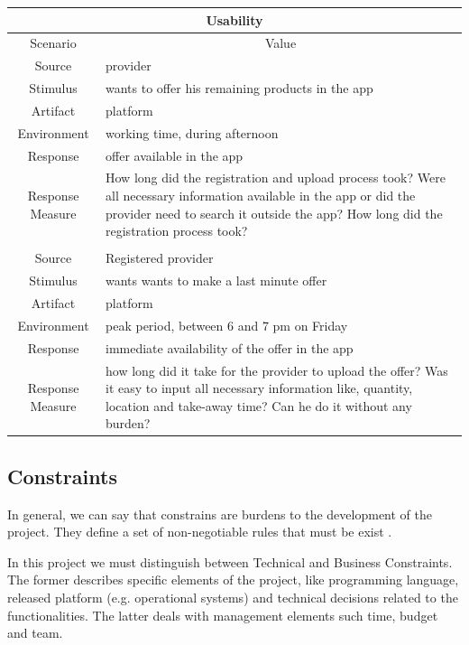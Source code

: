 \begin{table}[H]
    \begin{tabularx}{\textwidth}{|c|X|}
        \hline
        \multicolumn{2}{c}{\textbf{Usability}} \\
        \hline
        \toprule
        \multicolumn{1}{c}{Scenario} & \multicolumn{1}{c}{Value} \\
        \midrule
        Source & \gls{provider} \\
        Stimulus & wants to offer his remaining products in the app \\
        Artifact & platform \\
        Environment & working time, during afternoon \\
        Response & offer available in the app \\
        Response Measure & How long did the registration and upload process took? Were all necessary information
        available in the app or did the \gls{provider} need to search it outside the app? How long did the registration
        process took? \\
         & \\
        Source & Registered \gls{provider} \\
        Stimulus & wants wants to make a last minute offer \\
        Artifact & platform \\
        Environment & peak period, between 6 and 7 pm on Friday \\
        Response & immediate availability of the offer in the app \\
        Response Measure & how long did it take for the \gls{provider} to upload the offer? Was it easy to input all
        necessary information like, quantity, location and take-away time? Can he do it without any burden? \\
        \bottomrule
    \end{tabularx}
\end{table}

\newpage
\subsection{Constraints}

In general, we can say that constrains are burdens to the development of the project. They define a set of non-negotiable
rules that must be exist \cite{refonline:EFAD}. 

In this project we must distinguish between Technical and Business Constraints. The former describes specific elements
of the project, like programming language, released platform (e.g. operational systems) and technical decisions related to 
the functionalities. The latter deals with management elements\cite{refonline:EFAD} such time, budget and team.



